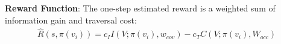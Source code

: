 \documentclass[letterpaper]{article} %
\newcommand{\ph}[1]{{\textbf{#1}:}} %
\begin{document}





\ph{Reward Function} The one-step estimated reward is a weighted sum of information gain and traversal cost:
\begin{align}
    \hat{R}(s, \pi(v_i)) = c_{I} I(V; \pi(v_i), w_{cov}) - c_{T}  C(V; \pi(v_i), W_{occ})
    \label{eq:lattice_reward}
\end{align}












\end{document}
